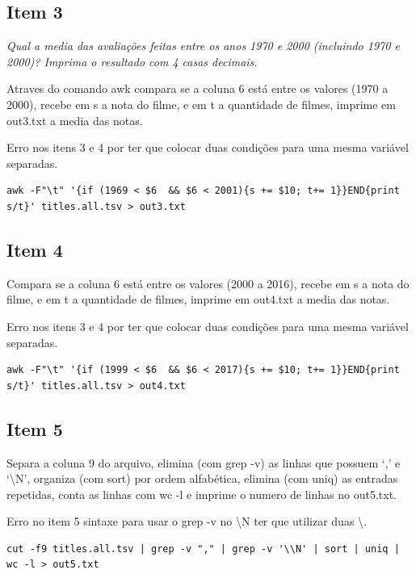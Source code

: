 \documentclass[12pt]{article}
\begin{document}
\subsection*{Item 3}

\noindent\emph{Qual a media das avaliações feitas entre os anos 1970 e 2000 (incluindo 1970 e 2000)? Imprima o resultado com 4 casas decimais.}
\vspace{1em}

Atraves do comando awk compara se a coluna 6 está entre os valores (1970 a 2000), recebe em s a nota do filme, e em t a quantidade de filmes, imprime em out3.txt a media das notas.

Erro nos itens 3 e 4 por ter que colocar duas condições para uma mesma variável separadas.

\begin{verbatim}
awk -F"\t" '{if (1969 < $6  && $6 < 2001){s += $10; t+= 1}}END{print s/t}' titles.all.tsv > out3.txt
\end{verbatim}

\subsection*{Item 4}

Compara se a coluna 6 está entre os valores (2000 a 2016), recebe em s a nota do filme, e em t a quantidade de filmes, imprime em out4.txt a media das notas.

Erro nos itens 3 e 4 por ter que colocar duas condições para uma mesma variável separadas.

\begin{verbatim}
awk -F"\t" '{if (1999 < $6  && $6 < 2017){s += $10; t+= 1}}END{print s/t}' titles.all.tsv > out4.txt
\end{verbatim}

\subsection*{Item 5}

Separa a coluna 9 do arquivo, elimina (com grep -v) as linhas que possuem `,' e `\textbackslash	N', organiza (com sort) por ordem alfabética, elimina (com uniq) as entradas repetidas, conta as linhas com wc -l e imprime o numero de linhas no out5.txt.

Erro no item 5 sintaxe para usar o grep -v no \textbackslash N ter que utilizar duas \textbackslash .

\begin{verbatim}
cut -f9 titles.all.tsv | grep -v "," | grep -v '\\N' | sort | uniq | wc -l > out5.txt
\end{verbatim}
\end{document}
